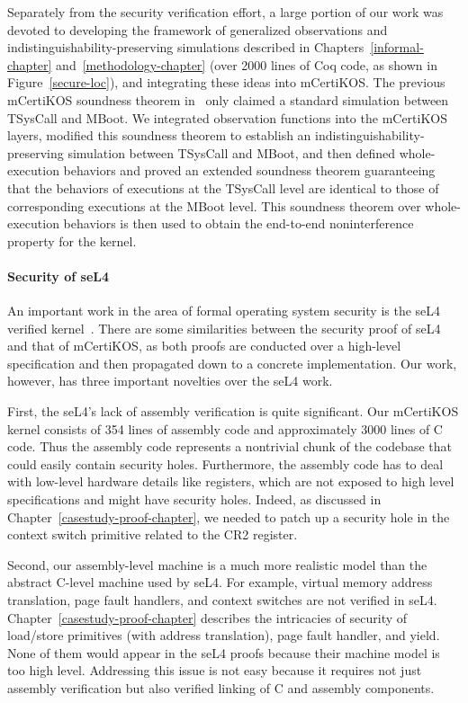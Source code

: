 Separately from the security verification effort, a large portion of
our work was devoted to developing the framework of generalized
observations and indistinguishability-preserving simulations described
in Chapters~\ref{informal-chapter} and~\ref{methodology-chapter} (over 2000 lines of
Coq code, as shown in Figure~\ref{secure-loc}), and integrating these
ideas into mCertiKOS. The previous mCertiKOS soundness theorem
in~\cite{certikos-popl} only claimed a standard simulation between
TSysCall and MBoot. We integrated observation functions into the
mCertiKOS layers, modified this soundness theorem to establish an
indistinguishability-preserving simulation between TSysCall and MBoot,
and then defined whole-execution behaviors and proved an extended
soundness theorem guaranteeing that the behaviors of executions at the
TSysCall level are identical to those of corresponding executions at
the MBoot level. This soundness theorem over whole-execution behaviors
is then used to obtain the end-to-end noninterference property for
the kernel.

\paragraph{Security of seL4}
An important work in the area of formal operating system
security is the seL4 verified
kernel~\cite{klein14,murray12,murray13,sewell11}.  There are some
similarities between the security proof of seL4 and that of mCertiKOS,
as both proofs are conducted over a high-level specification and then
propagated down to a concrete implementation.  Our work, however, has
three important novelties over the seL4 work. 

First, the seL4's lack of assembly verification is quite
  significant. Our mCertiKOS kernel consists of 354 lines
  of assembly code and approximately 3000 lines of C code. Thus the
  assembly code represents a nontrivial chunk of the codebase that
  could easily contain security holes.  Furthermore, the assembly code
  has to deal with low-level hardware details like registers, which
  are not exposed to high level specifications and might have security
  holes. Indeed, as discussed in Chapter~\ref{casestudy-proof-chapter}, we
  needed to patch up a security hole in the context switch primitive
  related to the CR2 register.
  
Second, our assembly-level machine is a much more realistic
  model than the abstract C-level machine used by seL4. For example,
  virtual memory address translation, page fault handlers, and context
  switches are not verified in seL4.  Chapter~\ref{casestudy-proof-chapter}
  describes the intricacies of security of load/store primitives (with
  address translation), page fault handler, and yield. None of them
  would appear in the seL4 proofs because their machine model is too
  high level. Addressing this issue is not easy because it requires
  not just assembly verification but also verified linking of C and
  assembly components. 


